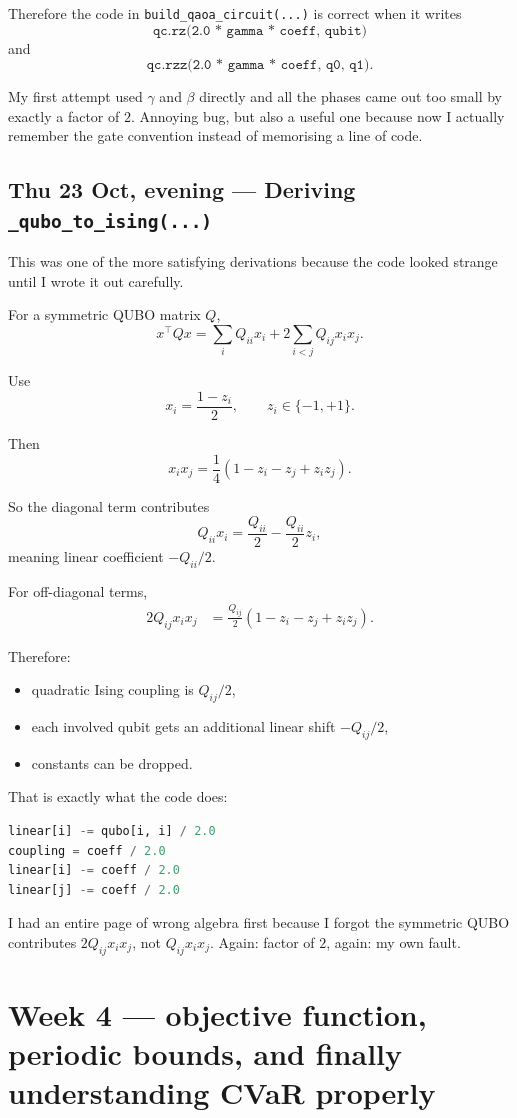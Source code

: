 \documentclass[11pt]{article}
\newcommand{\entry}[2]{\subsection*{#1 --- #2}}
\newcommand{\repo}[1]{\texttt{#1}}
\begin{document}
Therefore the code in \repo{build\_qaoa\_circuit(...)} is correct when it writes
\[
\repo{qc.rz(2.0 * gamma * coeff, qubit)}
\]
and
\[
\repo{qc.rzz(2.0 * gamma * coeff, q0, q1)}.
\]

My first attempt used \(\gamma\) and \(\beta\) directly and all the phases came out too small by
exactly a factor of \(2\). Annoying bug, but also a useful one because now I actually remember the
gate convention instead of memorising a line of code.

\entry{Thu 23 Oct, evening}{Deriving \repo{\_qubo\_to\_ising(...)}}

This was one of the more satisfying derivations because the code looked strange until I wrote it
out carefully.

For a symmetric QUBO matrix \(Q\),
\[
x^\top Q x

=
\sum_i Q_{ii} x_i
+
2\sum_{i<j} Q_{ij} x_i x_j.
\]

Use
\[
x_i = \frac{1 - z_i}{2},
\qquad z_i \in \{-1,+1\}.
\]

Then
\[
x_i x_j
=
\frac{1}{4}(1 - z_i - z_j + z_i z_j).
\]

So the diagonal term contributes
\[
Q_{ii}x_i = \frac{Q_{ii}}{2} - \frac{Q_{ii}}{2} z_i,
\]
meaning linear coefficient \(-Q_{ii}/2\).

For off-diagonal terms,
\begin{align*}
2Q_{ij}x_i x_j
&=
\frac{Q_{ij}}{2}(1 - z_i - z_j + z_i z_j).
\end{align*}

Therefore:
\begin{itemize}[leftmargin=1.4em]
\item quadratic Ising coupling is \(Q_{ij}/2\),
\item each involved qubit gets an additional linear shift \(-Q_{ij}/2\),
\item constants can be dropped.
\end{itemize}

That is exactly what the code does:
\begin{lstlisting}[language=Python]
linear[i] -= qubo[i, i] / 2.0
coupling = coeff / 2.0
linear[i] -= coeff / 2.0
linear[j] -= coeff / 2.0
\end{lstlisting}

I had an entire page of wrong algebra first because I forgot the symmetric QUBO contributes
\(2Q_{ij}x_ix_j\), not \(Q_{ij}x_ix_j\). Again: factor of \(2\), again: my own fault.

\section*{Week 4 --- objective function, periodic bounds, and finally understanding CVaR properly}
\end{document}
